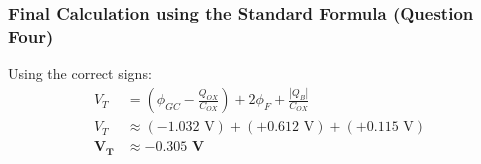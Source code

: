 \documentclass{article}
\begin{document}
\subsubsection*{Final Calculation using the Standard Formula (Question Four)}
Using the correct signs:
\begin{align*}
V_T &= \left(\phi_{GC} - \frac{Q_{OX}}{C_{OX}}\right) + 2\phi_F + \frac{|Q_B|}{C_{OX}} \\
V_T &\approx (-1.032\text{ V}) + (+0.612\text{ V}) + (+0.115\text{ V}) \\
\mathbf{V_T} &\approx \mathbf{-0.305\text{ V}}
\end{align*}
\end{document}
